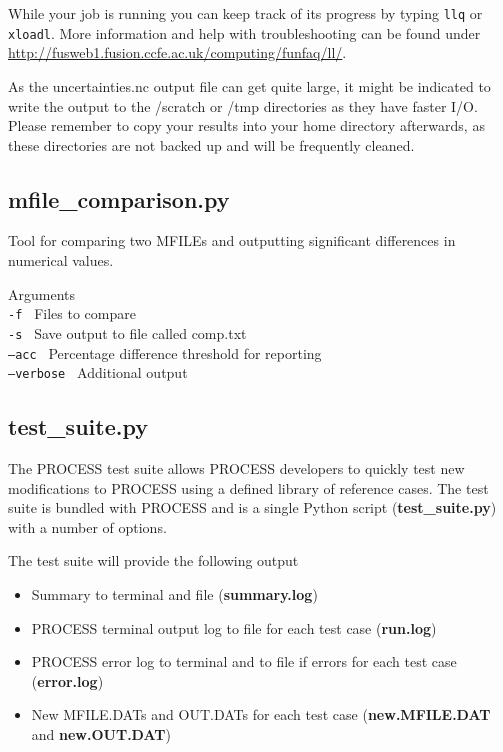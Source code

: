 While your job is running you can keep track of its progress by typing \texttt{llq} or \texttt{xloadl}. More information and help with troubleshooting can be found under \url{http://fusweb1.fusion.ccfe.ac.uk/computing/funfaq/ll/}.

As the uncertainties.nc output file can get quite large, it might be indicated to write the output to the /scratch or /tmp directories as they have faster I/O. Please remember to copy your results into your home directory afterwards, as these directories are not backed up and will be frequently cleaned.


\subsection{mfile\_comparison.py}
Tool for comparing two MFILEs and outputting significant differences in numerical values.

Arguments\\
\texttt{-f        }     Files to compare\\
\texttt{-s        }     Save output to file called comp.txt\\
\texttt{--acc     }     Percentage difference threshold for reporting\\
\texttt{--verbose }     Additional output\\


\subsection{test\_suite.py}

The PROCESS test suite allows PROCESS developers to quickly test new modifications to PROCESS using a defined library of reference cases. The test suite is bundled with PROCESS and is a single Python script (\textbf{test\_suite.py}) with a number of options.

The test suite will provide the following output

\begin{itemize}
\item Summary to terminal and file (\textbf{summary.log})
\item PROCESS terminal output log to file for each test case (\textbf{run.log})
\item PROCESS error log to terminal and to file if errors for each test case (\textbf{error.log})
\item New MFILE.DATs and OUT.DATs for each test case (\textbf{new.MFILE.DAT} and \textbf{new.OUT.DAT})
\end{itemize}

